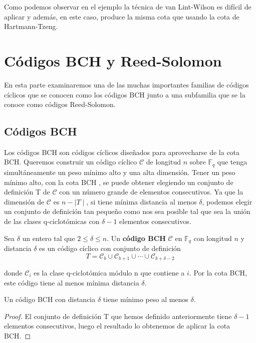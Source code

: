 Como podemos observar en el ejemplo la técnica de van Lint-Wilson es difícil de aplicar y además, en este caso, produce la misma cota que usando la cota de Hartmann-Tzeng.

\section{Códigos BCH y Reed-Solomon}

En esta parte examinaremos una de las muchas importantes familias de códigos cíclicos que se conocen como los códigos BCH junto a una subfamilia que se la conoce como códigos Reed-Solomon.

\subsection{Códigos BCH}

Los códigos BCH son códigos cíclicos diseñados para aprovecharse de la cota BCH. Queremos construir un código cíclico $\mathcal{C}$ de longitud $n$ sobre $\mathbb{F}_q$ que tenga simultáneamente un peso mínimo alto y una alta dimensión. Tener un peso mínimo alto, con la cota BCH , se puede obtener elegiendo un conjunto de definición T de $\mathcal{C}$ con un número grande de elementos consecutivos. Ya que la dimensión de $\mathcal{C}$ es $n - \mid T \mid$, si tiene mínima distancia al menos $\delta$, podemos elegir un conjunto de definición tan pequeño como nos sea posible tal que sea la unión de las clases q-ciclotómicas con $\delta -1$ elementos consecutivos. 


\begin{definition}
Sea $\delta$ un entero tal que $ 2 \leq \delta \leq n$. Un \textbf{código BCH} $\mathcal{C}$ en $\mathbb{F}_q$ con longitud $n$ y distancia $\delta$ es un código cíclico con conjunto de definición 
\[
T = \mathcal{C}_b \cup \mathcal{C}_{b+1} \cup \cdots \cup \mathcal{C}_{b+\delta -2}
\]

donde $\mathcal{C}_i$ es la clase q-ciclotómica módulo n que contiene a $i$. Por la cota BCH, este código tiene al menos mínima distancia $\delta$.
\end{definition}


\begin{theorem}
\label{th:bch_dist_min}
Un código BCH con distancia $\delta$ tiene mínimo peso al menos $\delta$.
\end{theorem}
\begin{proof}
El conjunto de definición T que hemos definido anteriormente tiene $\delta -1$ elementos consecutivos, luego el resultado lo obtenemos de aplicar la cota BCH.
\end{proof}

